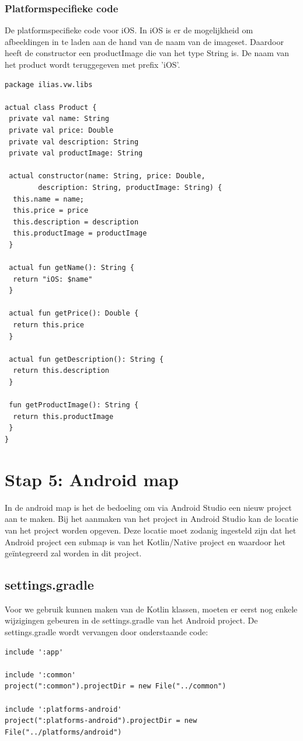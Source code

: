\subsubsection{Platformspecifieke code}
De platformspecifieke code voor iOS. In iOS is er de mogelijkheid om afbeeldingen in te laden aan de hand van de naam van de imageset. Daardoor heeft de constructor een productImage die van het type String is. De naam van het product wordt teruggegeven met prefix 'iOS'.
\begin{lstlisting}
package ilias.vw.libs

actual class Product {
 private val name: String
 private val price: Double
 private val description: String
 private val productImage: String

 actual constructor(name: String, price: Double, 
		description: String, productImage: String) {
  this.name = name;
  this.price = price
  this.description = description
  this.productImage = productImage
 }

 actual fun getName(): String {
  return "iOS: $name"
 }

 actual fun getPrice(): Double {
  return this.price
 }

 actual fun getDescription(): String {
  return this.description
 }

 fun getProductImage(): String {
  return this.productImage
 }
}
\end{lstlisting}

\section{Stap 5: Android map}
In de android map is het de bedoeling om via Android Studio een nieuw project aan te maken. Bij het aanmaken van het project in Android Studio kan de locatie van het project worden opgeven. Deze locatie moet zodanig ingesteld zijn dat het Android project een submap is van het Kotlin/Native project en waardoor het geïntegreerd zal worden in dit project.

\subsection{settings.gradle}
Voor we gebruik kunnen maken van de Kotlin klassen, moeten er eerst nog enkele wijzigingen gebeuren in de settings.gradle van het Android project. De settings.gradle wordt vervangen door onderstaande code:

\begin{lstlisting}
include ':app'

include ':common'
project(":common").projectDir = new File("../common")

include ':platforms-android'
project(":platforms-android").projectDir = new File("../platforms/android")
\end{lstlisting}

